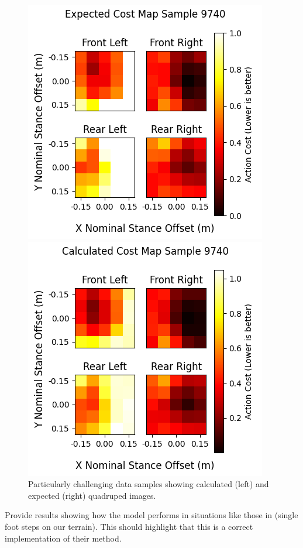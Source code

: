 \begin{figure}[H]
  \centering
  \begin{minipage}[T]{0.45\textwidth}
    \centering
    \includegraphics[width=\textwidth]{images/data/training/challenging-expected.png}
  \end{minipage}
  \hfill
  \begin{minipage}[T]{0.45\textwidth}
    \centering
    \includegraphics[width=\textwidth]{images/data/training/challenging-calculated.png}
  \end{minipage}
  \hfill

  \caption{Particularly challenging data samples showing calculated (left) and
  expected (right) quadruped images.}
  \label{fig:data-cn-challenging-comparison}
\end{figure}

\begin{todo}
  Provide results showing how the model performs in situations like those
  in \cite{bratta_contactnet_2024} (single foot steps on our terrain).
  This should highlight that this is a correct implementation of their method.
\end{todo}
